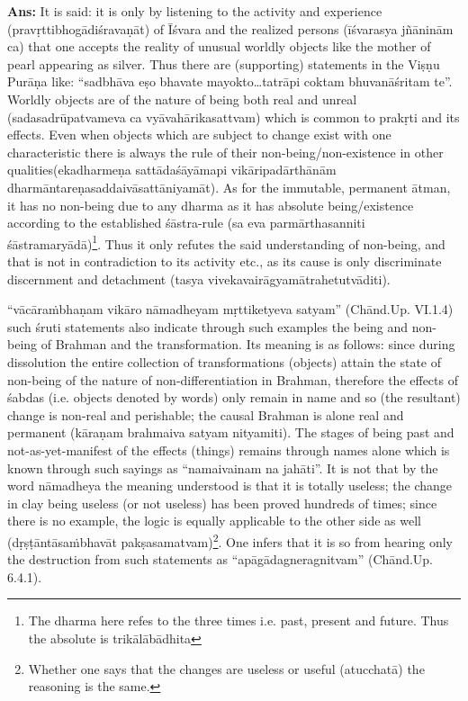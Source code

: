 \textbf{Ans:} It is said: it is only by listening to the activity and experience (pravṛttibhogādiśravaṇāt) of Īśvara and the realized persons (īśvarasya jñāninām ca) that one accepts the reality of unusual worldly objects like the mother of pearl appearing as silver. Thus there are (supporting) statements in the Viṣṇu Purāṇa like: “sadbhāva eṣo bhavate mayo\-kto…tatrāpi coktam bhuvanāśritam te”. Worldly objects are of the nature of being both real and unreal (sadasadrūpatvameva ca vyāvahāri\-kasattvam) which is common to prakṛti and its effects. Even when objects which are subject to change exist with one characteristic there is always the rule of their non-being/non-existence in other qualities\break (ekadharmeṇa sattādaśāyāmapi vikāripadārthānām dharmāntareṇa\break saddaivāsattāniyamāt). As for the immutable, permanent ātman, it has no non-being due to any dharma as it has absolute being/existence according to the established śāstra-rule (sa eva parmārthasanniti śāstramaryādā)\footnote{The dharma here refes to the three times i.e. past, present and future. Thus the absolute is trikālābādhita}. Thus it only refutes the said understanding of non-being, and that is not in contradiction to its activity etc., as its cause is only discriminate discernment and detachment (tasya vivekavairāgyamātrahetutvāditi).

\vskip 1pt

“vācāraṁbhaṇam vikāro nāmadheyam mṛttiketyeva satyam” (Chānd.\break Up. VI.1.4) such śruti statements also indicate through such examples the being and non-being of Brahman and the transformation. Its meaning is as follows: since during dissolution the entire collection of transformations (objects) attain the state of non-being of the nature of non-differentiation in Brahman, therefore the effects of śabdas (i.e. objects denoted by words) only remain in name and so (the resultant) change is non-real and perishable; the causal Brahman is alone real and permanent (kāraṇam brahmaiva satyam nityamiti). The stages of being past and not-as-yet-manifest of the effects (things) remains through names alone which is known through such sayings as “namaivainam na jahāti”. It is not that by the word nāmadheya the meaning understood is that it is totally useless; the change in clay being useless (or not useless) has been proved hundreds of times; since there is no example,  the logic is equally applicable to the other side as well (dṛṣṭāntāsaṁbhavāt pakṣasamatvam)\footnote{Whether one says that the changes are useless or useful (atucchatā) the reasoning is the same.}. One infers that it is so from hearing only the destruction from such statements as “apāgādagneragnitvam” (Chānd.Up. 6.4.1).  

